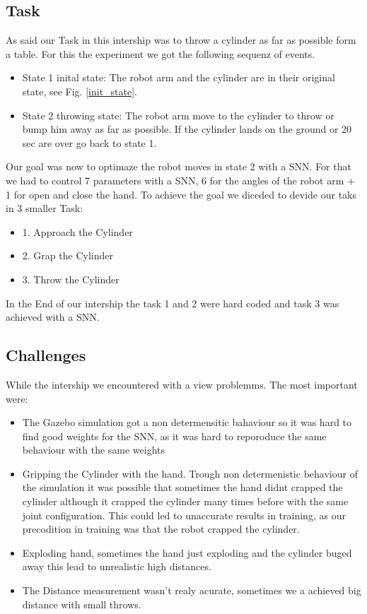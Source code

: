 \subsection{Task}
As said our Task in this intership was to throw a cylinder as far as possible form a table. For this the experiment we got the following sequenz of events.
 \begin{itemize}
\item State 1 inital state: The robot arm and the cylinder are in their original state, see Fig. \ref{init_state}.
\item State 2 throwing state: The robot arm move to the cylinder to throw or bump him away as far as possible. If the cylinder lands on the ground or 20 sec are over go back to state 1.
\end{itemize}
Our goal was now to optimaze the robot moves in state 2 with a SNN. For that we had to control 7 parameters with a SNN, 6 for the angles of the robot arm + 1 for open and close the hand. 
To achieve the goal we diceded to devide our taks in 3 smaller Task:
 \begin{itemize}
\item 1. Approach the Cylinder
\item 2. Grap the Cylinder
\item 3. Throw the Cylinder
\end{itemize}
In the End of our intership the task 1 and 2 were hard coded and task 3 was achieved with a SNN.
\subsection{Challenges}
\label{sec:challenges}
While the intership we encountered with a view problemms. The most important were:
 \begin{itemize}
\item The Gazebo simulation got a non determensitic bahaviour so it was hard to find good weights for the SNN, as it was hard to reporoduce the same behaviour with the same weights
\item Gripping the Cylinder with the hand. Trough non determenistic behaviour of the simulation it was possible that sometimes the hand didnt crapped the cylinder although it crapped the cylinder many times before with the same joint configuration. This could led to unaccurate results in training, as our precodition in training was that the robot crapped the cylinder.
\item Exploding hand, sometimes the hand just exploding and the cylinder buged away this lead to unrealistic high distances.
\item The Distance measurement wasn't realy acurate, sometimes we a achieved big distance with small throws.
\end{itemize}


